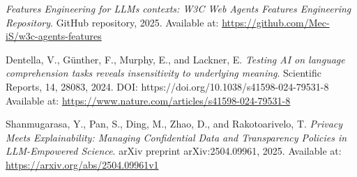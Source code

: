 \documentclass[11pt,a4paper]{article}
\begin{document}
\begin{thebibliography}{9}
		\textit{Features Engineering for LLMs contexts: W3C Web Agents Features Engineering Repository}.
		GitHub repository, 2025.
		Available at: \url{https://github.com/Mec-iS/w3c-agents-features}

		Dentella, V., Günther, F., Murphy, E., and Lackner, E.
		\textit{Testing AI on language comprehension tasks reveals insensitivity to underlying meaning}.
		Scientific Reports, 14, 28083, 2024.
		DOI: https://doi.org/10.1038/s41598-024-79531-8
		Available at: \url{https://www.nature.com/articles/s41598-024-79531-8}

		Shanmugarasa, Y., Pan, S., Ding, M., Zhao, D., and Rakotoarivelo, T.
		\textit{Privacy Meets Explainability: Managing Confidential Data and Transparency Policies in LLM-Empowered Science}.
		arXiv preprint arXiv:2504.09961, 2025.
		Available at: \url{https://arxiv.org/abs/2504.09961v1}

	\end{thebibliography}
	
\end{document}

